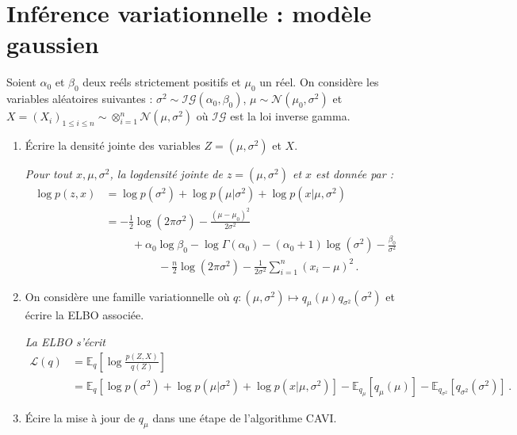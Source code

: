 \documentclass[a4paper,10pt,fleqn]{article}
\newcommand{\1}{\ensuremath{\mathbbm{1}}}
\begin{document}
\section{Inf\'erence variationnelle : mod\`ele gaussien}
Soient $\alpha_0$ et $\beta_0$ deux re\'els strictement positifs et $\mu_0$ un r\'eel. On consid\`ere les variables al\'eatoires suivantes : $\sigma^2 \sim\mathcal{IG}(\alpha_0,\beta_0)$, $\mu\sim\mathcal{N}(\mu_0,\sigma^2)$ et $X = (X_i)_{1\leq i\leq n}\sim\otimes_{i=1}^n\mathcal{N}(\mu,\sigma^2)$ o\`u $\mathcal{IG}$ est la loi inverse gamma.
\begin{enumerate}
\item \'Ecrire la densit\'e jointe des variables $Z=(\mu,\sigma^2)$ et $X$.

\vspace{.2cm}

{\em
Pour tout $x,\mu,\sigma^2$, la logdensit\'e jointe de $z=(\mu,\sigma^2)$ et $x$ est donn\'ee par :
\begin{align*}
\log p (z,x) &= \log p(\sigma^2) + \log p(\mu|\sigma^2) + \log p(x|\mu,\sigma^2)\\
&= -\frac{1}{2}\log(2\pi \sigma^2) - \frac{(\mu-\mu_0)^2}{2\sigma^2} \\
&\hspace{1cm} + \alpha_0\log \beta_0 - \log \Gamma(\alpha_0) - (\alpha_0+1)\log(\sigma^{2}) - \frac{\beta_0}{\sigma^2}\\
&\hspace{2cm} -\frac{n}{2}\log(2\pi \sigma^2) - \frac{1}{2\sigma^2}\sum_{i=1}^n(x_i-\mu)^2\,.
\end{align*}
}

\item On consid\`ere une famille variationnelle o\`u $q:(\mu,\sigma^2)\mapsto q_\mu(\mu)q_{\sigma^2}(\sigma^2)$ et \'ecrire la ELBO associ\'ee.

\vspace{.2cm}

{\em
La ELBO s'\'ecrit
\begin{align*}
\mathcal{L}(q) &= \mathbb{E}_q\left[\log\frac{p(Z,X)}{q(Z)}\right]\\
&= \mathbb{E}_q\left[\log p(\sigma^2) + \log p(\mu|\sigma^2) + \log p(x|\mu,\sigma^2)\right] - \mathbb{E}_{q_\mu}\left[q_{\mu}(\mu)\right] - \mathbb{E}_{q_{\sigma^2}}\left[q_{\sigma^2}(\sigma^2)\right]\,.
\end{align*}
}
\item \'Ecire la mise \`a jour de $q_\mu$ dans une \'etape de l'algorithme CAVI. 


\end{enumerate}
\end{document}
